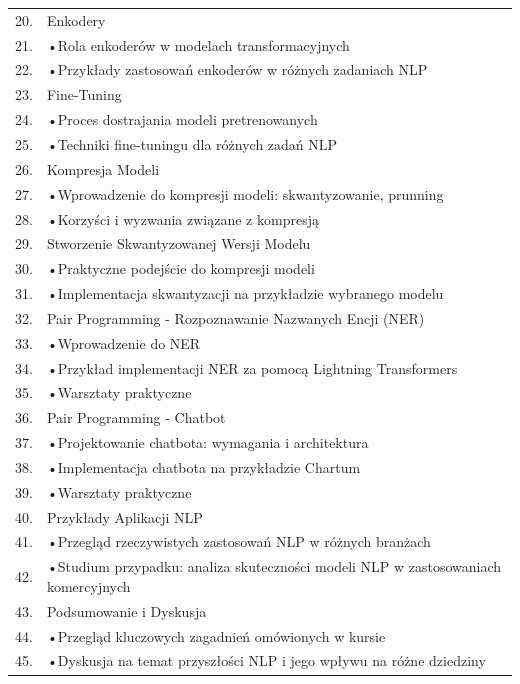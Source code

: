 \documentclass[12pt, a4paper]{article}
\begin{document}
{\begin{longtable}{m{1.5cm}m{14.5cm}}
  \rowcolor{tableRowAlt} 20. & Enkodery \\
  \rowcolor{tableRowLight} 21. & •Rola enkoderów w modelach transformacyjnych \\
  \rowcolor{tableRowAlt} 22. & •Przykłady zastosowań enkoderów w różnych zadaniach NLP \\
  \rowcolor{tableRowLight} 23. & Fine-Tuning \\
  \rowcolor{tableRowAlt} 24. & •Proces dostrajania modeli pretrenowanych \\
  \rowcolor{tableRowLight} 25. & •Techniki fine-tuningu dla różnych zadań NLP \\
  \rowcolor{tableRowAlt} 26. & Kompresja Modeli \\
  \rowcolor{tableRowLight} 27. & •Wprowadzenie do kompresji modeli: skwantyzowanie, prunning \\
  \rowcolor{tableRowAlt} 28. & •Korzyści i wyzwania związane z kompresją \\
  \rowcolor{tableRowLight} 29. & Stworzenie Skwantyzowanej Wersji Modelu \\
  \rowcolor{tableRowAlt} 30. & •Praktyczne podejście do kompresji modeli \\
  \rowcolor{tableRowLight} 31. & •Implementacja skwantyzacji na przykładzie wybranego modelu \\
  \rowcolor{tableRowAlt} 32. & Pair Programming - Rozpoznawanie Nazwanych Encji (NER) \\
  \rowcolor{tableRowLight} 33. & •Wprowadzenie do NER \\
  \rowcolor{tableRowAlt} 34. & •Przykład implementacji NER za pomocą Lightning Transformers \\
  \rowcolor{tableRowLight} 35. & •Warsztaty praktyczne \\
  \rowcolor{tableRowAlt} 36. & Pair Programming - Chatbot \\
  \rowcolor{tableRowLight} 37. & •Projektowanie chatbota: wymagania i architektura \\
  \rowcolor{tableRowAlt} 38. & •Implementacja chatbota na przykładzie Chartum \\
  \rowcolor{tableRowLight} 39. & •Warsztaty praktyczne \\
  \rowcolor{tableRowAlt} 40. & Przykłady Aplikacji NLP \\
  \rowcolor{tableRowLight} 41. & •Przegląd rzeczywistych zastosowań NLP w różnych branżach \\
  \rowcolor{tableRowAlt} 42. & •Studium przypadku: analiza skuteczności modeli NLP w zastosowaniach komercyjnych \\
  \rowcolor{tableRowLight} 43. & Podsumowanie i Dyskusja \\
  \rowcolor{tableRowAlt} 44. & •Przegląd kluczowych zagadnień omówionych w kursie \\
  \rowcolor{tableRowLight} 45. & •Dyskusja na temat przyszłości NLP i jego wpływu na różne dziedziny \\
\bottomrule
\end{longtable}}
\end{document}
